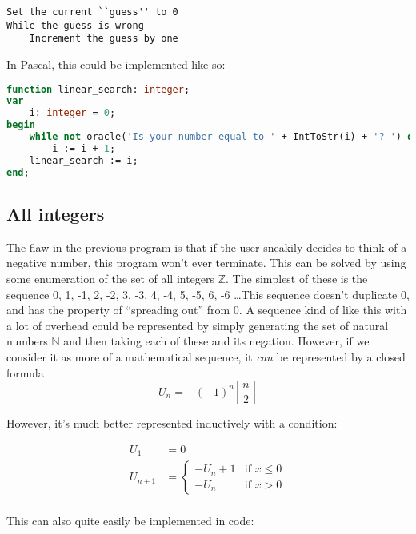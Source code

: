 \documentclass{article}
\begin{document}
\begin{lstlisting}[caption=Linear search on $\mathbb{N}$ pseudocode]
Set the current ``guess'' to 0
While the guess is wrong
    Increment the guess by one
\end{lstlisting}

    In Pascal, this could be implemented like so:

\begin{lstlisting}[language=Pascal, caption=Linear search on $\mathbb{N}$ implementation]
function linear_search: integer;
var
    i: integer = 0;
begin
    while not oracle('Is your number equal to ' + IntToStr(i) + '? ') do
		i := i + 1;
    linear_search := i;
end;
\end{lstlisting}

    \subsection{All integers}
    The flaw in the previous program is that if the user sneakily decides to
    think of a negative number, this program won't ever terminate. This can be
    solved by using some enumeration of the set of all integers $\mathbb{Z}$.
    The simplest of these is the sequence 0, 1, -1, 2, -2, 3, -3, 4, -4, 5, -5,
    6, -6 \ldots This sequence doesn't duplicate 0, and has the property of
    ``spreading out'' from 0. A sequence kind of like this with a lot of
    overhead could be represented by simply generating the set of natural
    numbers $\mathbb{N}$ and then taking each of these and its negation. However,
    if we consider it as more of a mathematical sequence, it \textit{can} be
    represented by a closed formula
    \begin{equation}
    U_n = -(-1)^n \left\lfloor \frac{n}{2} \right\rfloor
    \end{equation}

    However, it's much better represented inductively with a condition:

	\begin{align*}
        U_1 &= 0\\
		U_{n + 1} &= 
		\begin{cases}
			-U_n + 1        & \text{if } x \leq 0\\
			-U_n            & \text{if } x > 0
		\end{cases}\\
	\end{align*}

    This can also quite easily be implemented in code:
\end{document}
